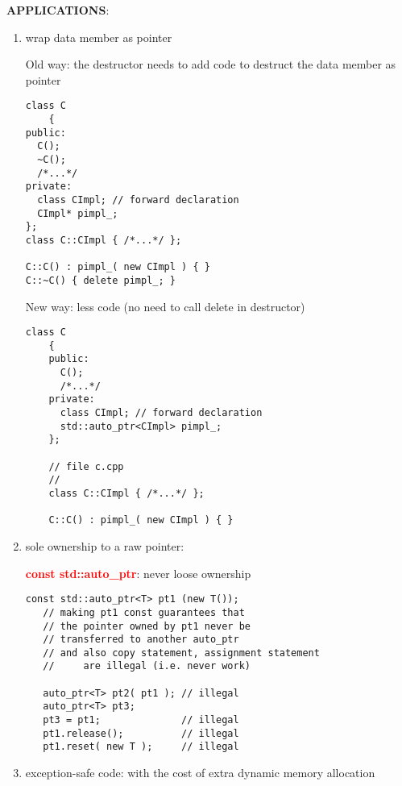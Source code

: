 % 
%     

{\bf APPLICATIONS}:
\begin{enumerate}
  \item wrap data member as pointer

Old way: the destructor needs to add code to destruct the data member as pointer
\begin{verbatim}
class C
    {
public:
  C();
  ~C();
  /*...*/
private:
  class CImpl; // forward declaration
  CImpl* pimpl_;
};
class C::CImpl { /*...*/ };

C::C() : pimpl_( new CImpl ) { }
C::~C() { delete pimpl_; }    
\end{verbatim}

New way: less code (no need to call delete in destructor)
\begin{lstlisting}
class C
    {
    public:
      C();
      /*...*/
    private:
      class CImpl; // forward declaration
      std::auto_ptr<CImpl> pimpl_;
    };

    // file c.cpp
    //
    class C::CImpl { /*...*/ };

    C::C() : pimpl_( new CImpl ) { }
\end{lstlisting}

  \item sole ownership to a raw pointer:

\textcolor{red}{\bf const std::auto\_ptr}: never loose ownership
\begin{lstlisting}
const std::auto_ptr<T> pt1 (new T());
   // making pt1 const guarantees that
   // the pointer owned by pt1 never be
   // transferred to another auto_ptr
   // and also copy statement, assignment statement 
   //     are illegal (i.e. never work) 

   auto_ptr<T> pt2( pt1 ); // illegal
   auto_ptr<T> pt3;
   pt3 = pt1;              // illegal
   pt1.release();          // illegal
   pt1.reset( new T );     // illegal   
\end{lstlisting}


  \item exception-safe code: with the cost of extra dynamic memory allocation
  

\end{enumerate}
